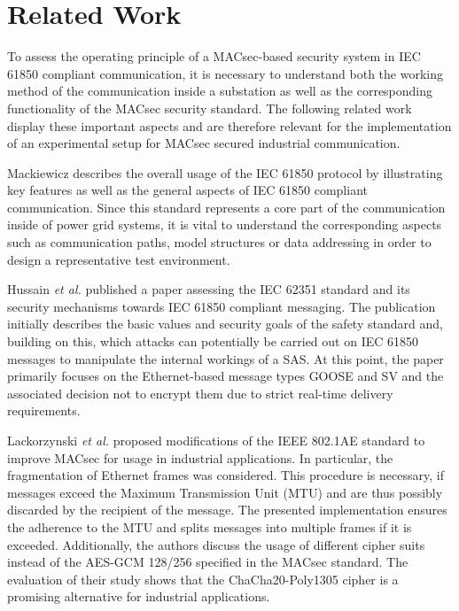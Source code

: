 \documentclass[conference, onecolumn, a4paper]{IEEEtran}
\begin{document}
\section{Related Work}
\label{chapter:relatedWork}
\noindent To assess the operating principle of a MACsec-based security system in IEC 61850 compliant communication, it is necessary to understand both 
the working method of the communication inside a substation as well as the corresponding functionality of the MACsec security standard. The following 
related work display these important aspects and are therefore relevant for the implementation of an experimental setup for MACsec secured industrial 
communication.

\smallskip
Mackiewicz \cite{IEC61850_Overview:2006} describes the overall usage of the IEC 61850 protocol by illustrating key features as well as the general 
aspects of IEC 61850 compliant communication. Since this standard represents a core part of the communication inside of power grid systems, it is vital 
to understand the corresponding aspects such as communication paths, model structures or data addressing in order to design a representative test 
environment. 

\smallskip
Hussain  \textit{et al.} \cite{Review_IEC62351:2019} published a paper assessing the IEC 62351 standard and its security mechanisms towards IEC 61850 
compliant messaging. The publication initially describes the basic values and security goals of the safety standard and, building on this, which attacks 
can potentially be carried out on IEC 61850 messages to manipulate the internal workings of a SAS. At this point, the paper primarily focuses on the 
Ethernet-based message types GOOSE and SV and the associated decision not to encrypt them due to strict real-time delivery requirements.  

\smallskip
Lackorzynski \textit{et al.} \cite{MACsecIndustrialOptimization:2020} proposed modifications of the IEEE 802.1AE standard to improve MACsec for usage 
in industrial applications. In particular, the fragmentation of Ethernet frames was considered. This procedure is necessary, if messages exceed the 
Maximum Transmission Unit (MTU) and are thus possibly discarded by the recipient of the message. The presented implementation ensures the adherence to 
the MTU and splits messages into multiple frames if it is exceeded. Additionally, the authors discuss the usage of different cipher suits instead of 
the AES-GCM 128/256 specified in the MACsec standard. The evaluation of their study shows that the ChaCha20-Poly1305 cipher is a promising alternative 
for industrial applications.
\end{document}
